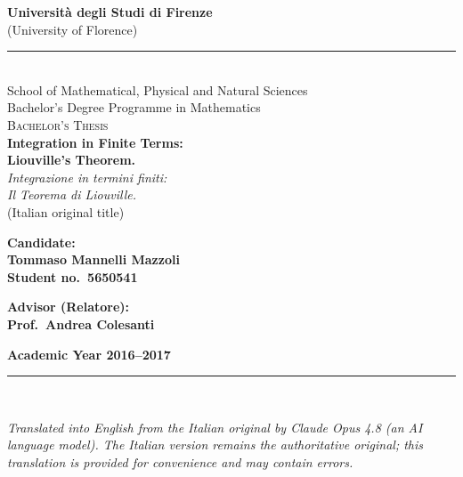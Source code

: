 \documentclass[11pt]{article}
\theoremstyle{plain}
\theoremstyle{definition}
\theoremstyle{remark}
\begin{document}
\begin{titlepage}
\centering

{\Large\bfseries Universit\`a degli Studi di Firenze}\\[2pt]
{\small (University of Florence)}\\[4pt]
\rule{\textwidth}{0.4pt}\\[6pt]

{\sc School of Mathematical, Physical and Natural Sciences}\\[2pt]
{Bachelor's Degree Programme in Mathematics}\\[40pt]

{\scshape Bachelor's Thesis}\\[60pt]

{\LARGE\bfseries Integration in Finite Terms:\\[6pt]
Liouville's Theorem.}\\[16pt]

{\large\itshape Integrazione in termini finiti:\\
Il Teorema di Liouville.}\\[10pt]
{\small (Italian original title)}\\[70pt]

\begin{flushleft}
\hspace{0.04\textwidth}%
\begin{minipage}[t]{0.45\textwidth}
\textbf{Candidate:}\\[4pt]
\textbf{Tommaso Mannelli Mazzoli}\\[2pt]
\textbf{\small Student no.\ 5650541}
\end{minipage}%
\hfill
\begin{minipage}[t]{0.45\textwidth}
\textbf{Advisor (Relatore):}\\[4pt]
\textbf{Prof.\ Andrea Colesanti}
\end{minipage}
\end{flushleft}

\vfill

{\bfseries Academic Year 2016--2017}\\[14pt]

\rule{\textwidth}{0.4pt}\\[6pt]
\begin{minipage}{0.92\textwidth}
\footnotesize\itshape
Translated into English from the Italian original by Claude Opus 4.8
(an AI language model). The Italian version remains the authoritative
original; this translation is provided for convenience and may contain
errors.
\end{minipage}

\end{titlepage}
\end{document}
